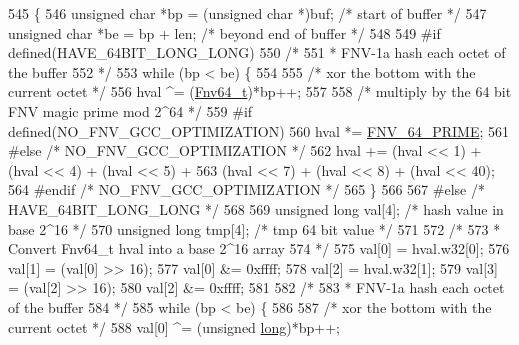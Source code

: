\begin{DoxyCode}
545 \{
546     \textcolor{keywordtype}{unsigned} \textcolor{keywordtype}{char} *bp = (\textcolor{keywordtype}{unsigned} \textcolor{keywordtype}{char} *)buf;   \textcolor{comment}{/* start of buffer */}
547     \textcolor{keywordtype}{unsigned} \textcolor{keywordtype}{char} *be = bp + len;               \textcolor{comment}{/* beyond end of buffer */}
548 
549 \textcolor{preprocessor}{#if defined(HAVE\_64BIT\_LONG\_LONG)}
550     \textcolor{comment}{/*}
551 \textcolor{comment}{     * FNV-1a hash each octet of the buffer}
552 \textcolor{comment}{     */}
553     \textcolor{keywordflow}{while} (bp < be) \{
554 
555         \textcolor{comment}{/* xor the bottom with the current octet */}
556         hval ^= (\hyperlink{group__hash__fnv_ga4b6673bffbef8355685a9e0129b86e16}{Fnv64\_t})*bp++;
557 
558         \textcolor{comment}{/* multiply by the 64 bit FNV magic prime mod 2^64 */}
559 \textcolor{preprocessor}{#if defined(NO\_FNV\_GCC\_OPTIMIZATION)}
560         hval *= \hyperlink{group__hash__fnv_ga843a032e93d6d54b28933d827eb4c966}{FNV\_64\_PRIME};
561 \textcolor{preprocessor}{#else }\textcolor{comment}{/* NO\_FNV\_GCC\_OPTIMIZATION */}\textcolor{preprocessor}{}
562         hval += (hval << 1) + (hval << 4) + (hval << 5) +
563                 (hval << 7) + (hval << 8) + (hval << 40);
564 \textcolor{preprocessor}{#endif }\textcolor{comment}{/* NO\_FNV\_GCC\_OPTIMIZATION */}\textcolor{preprocessor}{}
565     \}
566 
567 \textcolor{preprocessor}{#else }\textcolor{comment}{/* HAVE\_64BIT\_LONG\_LONG */}\textcolor{preprocessor}{}
568 
569     \textcolor{keywordtype}{unsigned} \textcolor{keywordtype}{long} val[4];                       \textcolor{comment}{/* hash value in base 2^16 */}
570     \textcolor{keywordtype}{unsigned} \textcolor{keywordtype}{long} tmp[4];                       \textcolor{comment}{/* tmp 64 bit value */}
571 
572     \textcolor{comment}{/*}
573 \textcolor{comment}{     * Convert Fnv64\_t hval into a base 2^16 array}
574 \textcolor{comment}{     */}
575     val[0] = hval.w32[0];
576     val[1] = (val[0] >> 16);
577     val[0] &= 0xffff;
578     val[2] = hval.w32[1];
579     val[3] = (val[2] >> 16);
580     val[2] &= 0xffff;
581 
582     \textcolor{comment}{/*}
583 \textcolor{comment}{     * FNV-1a hash each octet of the buffer}
584 \textcolor{comment}{     */}
585     \textcolor{keywordflow}{while} (bp < be) \{
586 
587         \textcolor{comment}{/* xor the bottom with the current octet */}
588         val[0] ^= (\textcolor{keywordtype}{unsigned} \hyperlink{generate__test__data__lte__sinr_8m_a0eab6be67e93c3411f7a8b53cc297285}{long})*bp++;

\end{DoxyCode}
